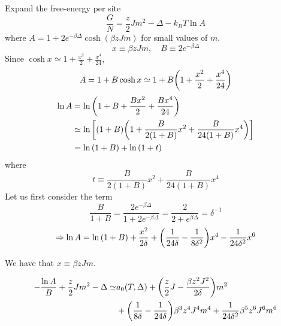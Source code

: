 \documentclass[../main/main.tex]{subfiles}
\begin{document}
\begin{exercise}
Expand the free-energy per site
\begin{equation}
  \frac{G}{N} = \frac{z}{2} J m^2 - \Delta - k_B T \ln{A}
\end{equation}
where \( A = 1 + 2 e^{-\beta \Delta } \cosh(\beta z J m) \) for small values of \( m \).
\begin{equation}
  x \equiv \beta z J m, \quad B \equiv 2 e^{-\beta \Delta }
\end{equation}
Since \( \cosh x \simeq 1 + \frac{x^2}{2} + \frac{x^4}{24} \),
\begin{equation}
  A = 1 + B \cosh x \simeq 1 + B \qty(1 + \frac{x^2}{2} + \frac{x^4}{24})
\end{equation}
\begin{equation}
\begin{split}
  \ln{A} &= \ln{\qty(1 + B + \frac{B x^2}{2} + \frac{B x^4}{24}) } \\
  &\simeq
  \ln{\qty[(1+B)\qty(1+ \frac{B}{2(1+B)}x^2 + \frac{B}{24(1+B)}x^4) ] } \\
  & = \ln{(1+B)} + \ln{(1+t)}
\end{split}
\end{equation}
where
\begin{equation}
  t \equiv \frac{B}{2(1+B)}x^2 + \frac{B}{24(1+B)}x^4
\end{equation}
Let us first consider the term
\begin{equation}
  \frac{B}{1+B} = \frac{2 e^{-\beta \Delta } }{1 + 2 e^{-\beta \Delta } } = \frac{2}{2+ e^{\beta \Delta } } = \delta ^{-1}
\end{equation}
\begin{equation}
  \Rightarrow \ln{A} = \ln{(1+B)} + \frac{x^2}{2 \delta } + \qty(\frac{1}{24 \delta } - \frac{1}{8 \delta ^2})x^4 - \frac{1}{24 \delta ^2}x^6
\end{equation}
\begin{remark}
We have that \( x \equiv \beta z J m \).
\end{remark}
\begin{equation}
\begin{split}
  - \frac{\ln{A} }{B} + \frac{z}{2} J m^2 - \Delta \simeq & a_0 (T,\Delta )
  + \qty(\frac{z}{2}J - \frac{\beta z^2 J^2}{2 \delta })m^2 \\
  &+ \qty(\frac{1}{8 \delta }- \frac{1}{24 \delta })\beta ^3 z^4 J^4 m^4
  + \frac{1}{24 \delta ^2} \beta ^5 z^6 J^6 m^6
\end{split}
\end{equation}

\end{exercise}
\end{document}
